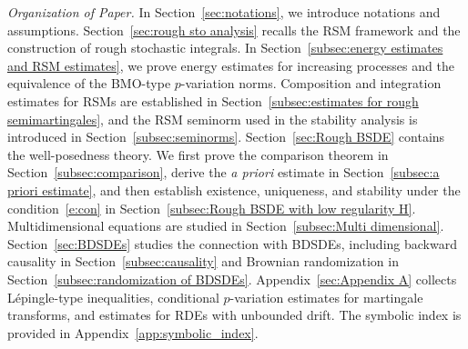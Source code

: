 \documentclass[11pt,reqno]{amsart}
\numberwithin{equation}{section}
\begin{document}
{\em Organization of Paper.}
In Section~\ref{sec:notations}, we introduce notations and assumptions. Section~\ref{sec:rough sto analysis} recalls the RSM framework and the construction of rough stochastic integrals. 
In Section~\ref{subsec:energy estimates and RSM estimates}, we prove energy estimates for increasing processes and the equivalence of the \textrm{BMO}-type $p$-variation norms. Composition and integration estimates for RSMs are established in Section~\ref{subsec:estimates for rough semimartingales}, and the RSM seminorm used in the stability analysis is introduced in Section~\ref{subsec:seminorms}. 
Section~\ref{sec:Rough BSDE} contains the well-posedness theory. We first prove the comparison theorem in Section~\ref{subsec:comparison}, derive the \emph{a priori} estimate in Section~\ref{subsec:a priori estimate}, and then establish existence, uniqueness, and stability under the condition~\eqref{e:con} in Section~\ref{subsec:Rough BSDE with low regularity H}. Multidimensional equations are studied in Section~\ref{subsec:Multi dimensional}.
Section~\ref{sec:BDSDEs} studies the connection with BDSDEs, including backward causality in Section~\ref{subsec:causality} and Brownian randomization in Section~\ref{subsec:randomization of BDSDEs}. 
Appendix~\ref{sec:Appendix A} collects L\'epingle-type inequalities, conditional $p$-variation estimates for martingale transforms, and estimates for RDEs with unbounded drift. The symbolic index is provided in Appendix~\ref{app:symbolic_index}.
\end{document}
